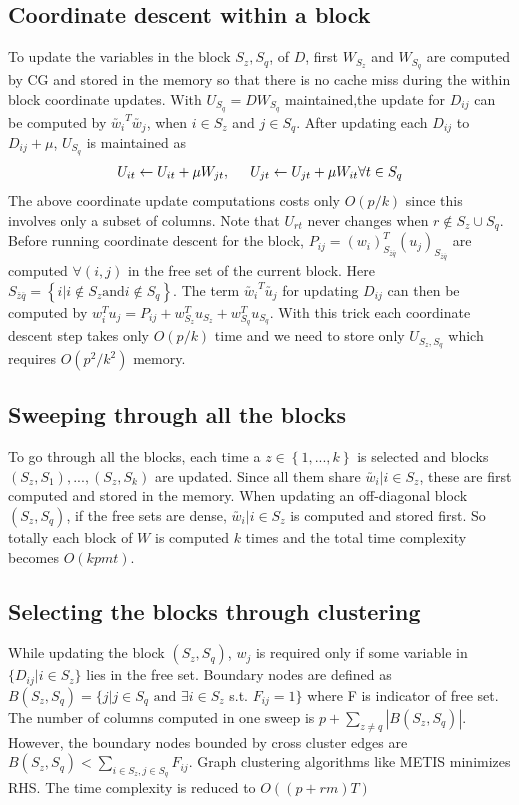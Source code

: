 \documentclass[12pt]{article}
\begin{document}
\subsection{Coordinate descent within a block}
To update the variables in the block $S_z, S_q$, of $D$, first $W_{S_z}$ and $W_{S_q}$ are computed by CG and stored in the memory so that there is no cache miss during the within block coordinate updates. With $U_{S_q}=DW_{S_q}$ maintained,the update for $D_{ij}$ can be computed by $\utilde{w_i}^T\utilde{w_j}$, when $i \in S_z$ and $j \in S_q$. After updating each $D_{ij}$ to $D_{ij}+\mu$, $U_{S_q}$ is maintained as \[U_{it}\leftarrow U_{it}+\mu W_{jt}, \hspace{0.2in} U_{jt}\leftarrow U_{jt}+\mu W_{it} \forall t \in S_q\]
The above coordinate update computations costs only $O(p/k)$ since this involves only a subset of columns. Note that $U_{rt}$ never changes when $r \not\in {S_z \cup S_q}$. 
Before running coordinate descent for the block, $P_{ij}=(w_{i})_{S_{\overline{z}\overline{q}}}^{T}(u_j)_{S_{\overline{z}\overline{q}}}$ are computed $\forall(i,j)$ in the free set of the current block. Here  $S_{\overline{z}\overline{q}}=\left\{i|i\not\in S_z \text{and} i\not\in S_q\right\}$. The term $\utilde{w_i}^T\utilde{u_j}$ for updating $D_{ij}$ can then be computed by $w_{i}^{T}u_{j}=P_{ij}+w_{S_{z}}^{T}u_{S_{z}}+w_{S_{q}}^{T}u_{S_{q}}$. With this trick each coordinate descent step takes only $O(p/k)$ time and we need to store only $U_{S_z, S_q}$ which requires $O(p^2/k^2)$ memory.

\subsection{Sweeping through all the blocks}
To go through all the blocks, each time a $z\in \left\{1,..., k\right\}$ is selected and blocks $(S_z,S_1),..., (S_z,S_k)$ are updated. Since all them share $\utilde{w_i}|i\in S_z$, these are first computed and stored in the memory. When updating an off-diagonal block $(S_z,S_q)$, if the free sets are dense,  $\utilde{w_i}|i\in S_z$ is computed and stored first. So totally each block of $W$ is computed $k$ times and the total time complexity becomes $O(kpmt)$.

 \subsection{Selecting the blocks through clustering}
 While updating the block $(S_z, S_q)$, $w_j$ is required only if some variable in $\{D_{ij}|i \in S_z\}$ lies in the free set. Boundary nodes are defined as $B(S_z, S_q)=\{j|j\in S_q \text{ and } \exists i \in S_z$ s.t. $F_{ij}=1\}$ where F is indicator of free set. The number of columns computed in one sweep is  $p+\displaystyle\sum_{z\neq q}|B(S_z, S_q)|$. However, the boundary nodes bounded by cross cluster edges are  $B(S_z, S_q)<\sum_{i \in S_z, j\in S_q}F_{ij}$. Graph clustering algorithms like METIS minimizes RHS. The time complexity is reduced to  $O((p+rm)T)$
 
\end{document}
